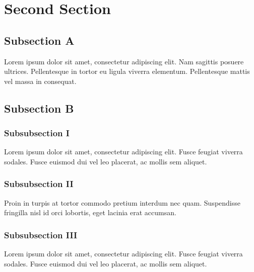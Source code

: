 \par\section{Second Section}
\par\subsection{Subsection A}
\par\noindent Lorem ipsum dolor sit amet, consectetur adipiscing elit. Nam sagittis posuere ultrices. Pellentesque in tortor eu ligula viverra elementum. Pellentesque mattis vel massa in consequat. 
\par\subsection{Subsection B}
\par\subsubsection{Subsubsection I}
\par\noindent Lorem ipsum dolor sit amet, consectetur adipiscing elit. Fusce feugiat viverra sodales. Fusce euismod dui vel leo placerat, ac mollis sem aliquet. 
\par\subsubsection{Subsubsection II}
\par\noindent Proin in turpis at tortor commodo pretium interdum nec quam. Suspendisse fringilla nisl id orci lobortis, eget lacinia erat accumsan. 
\par\subsubsection{Subsubsection III}
\par\noindent Lorem ipsum dolor sit amet, consectetur adipiscing elit. Fusce feugiat viverra sodales. Fusce euismod dui vel leo placerat, ac mollis sem aliquet.